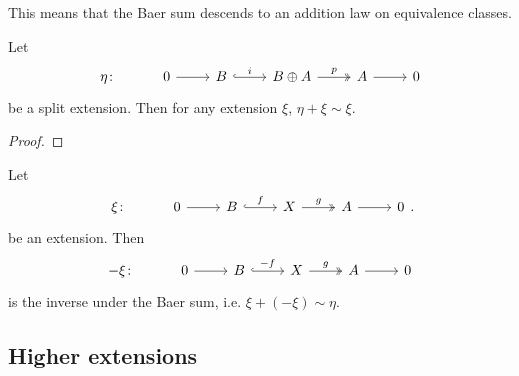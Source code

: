 \documentclass[main.tex]{subfiles}
\begin{document}
This means that the Baer sum descends to an addition law on equivalence classes.

\begin{lemma}
  \label{lemma:baer_sum_respects_identity}
  Let
  \begin{equation*}
    \begin{tikzcd}
      \eta\colon
      & 0
      \arrow[r]
      & B
      \arrow[r, hook, "i"]
      & B \oplus A
      \arrow[r, two heads, "p"]
      & A
      \arrow[r]
      & 0
    \end{tikzcd}
  \end{equation*}
  be a split extension. Then for any extension $\xi$, $\eta + \xi \sim \xi$.
\end{lemma}
\begin{proof}

\end{proof}

\begin{lemma}
  \label{lemma:baer_sum_preserves_inverses}
  Let
  \begin{equation*}
    \begin{tikzcd}
      \xi\colon
      & 0
      \arrow[r]
      & B
      \arrow[r, hook, "f"]
      & X
      \arrow[r, two heads, "g"]
      & A
      \arrow[r]
      & 0
    \end{tikzcd}.
  \end{equation*}
  be an extension. Then
  \begin{equation*}
    \begin{tikzcd}
      -\xi\colon
      & 0
      \arrow[r]
      & B
      \arrow[r, hook, "-f"]
      & X
      \arrow[r, two heads, "g"]
      & A
      \arrow[r]
      & 0
    \end{tikzcd}
  \end{equation*}
  is the inverse under the Baer sum, i.e. $\xi + (-\xi) \sim \eta$.
\end{lemma}

\subsection{Higher extensions}
\label{ssc:higher_extensions}
\end{document}
